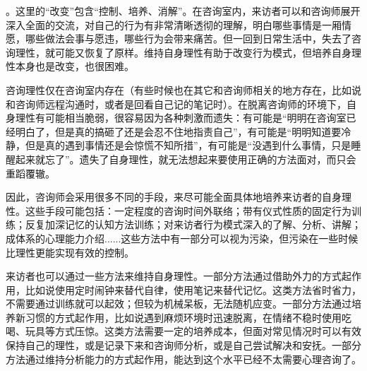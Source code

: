 。这里的“改变”包含“控制、培养、消解”。在咨询室内，来访者可以和咨询师展开深入全面的交流，对自己的行为有非常清晰透彻的理解，明白哪些事情是一厢情愿，哪些做法会事与愿违，哪些行为会带来痛苦。但一回到日常生活中，失去了咨询理性，就可能又恢复了原样。维持自身理性有助于改变行为模式，但培养自身理性本身也是改变，也很困难。

咨询理性仅在咨询室内存在（有些时候也在其它和咨询师相关的地方存在，比如说和咨询师远程沟通时，或者是回看自己记的笔记时）。在脱离咨询师的环境下，自身理性有可能相当脆弱，很容易因为各种刺激而遗失：有可能是“明明在咨询室已经明白了，但是真的搞砸了还是会忍不住地指责自己”，有可能是“明明知道要冷静，但是真的遇到事情还是会惊慌不知所措”，有可能是“没遇到什么事情，只是睡醒起来就忘了”。遗失了自身理性，就无法想起来要使用正确的方法面对，而只会重蹈覆辙。

因此，咨询师会采用很多不同的手段，来尽可能全面具体地培养来访者的自身理性。这些手段可能包括：一定程度的咨询时间外联络；带有仪式性质的固定行为训练；反复加深记忆的认知方法训练；对来访者行为模式深入的了解、分析、讲解；成体系的心理能力介绍......这些方法中有一部分可以视为污染，但污染在一些时候比理性更能实现有效的控制。

来访者也可以通过一些方法来维持自身理性。一部分方法通过借助外力的方式起作用，比如说使用定时闹钟来替代自律，使用笔记来替代记忆。这类方法省时省力，不需要通过训练就可以起效；但较为机械呆板，无法随机应变。一部分方法通过培养新习惯的方式起作用，比如说遇到麻烦环境时迅速脱离，在情绪不稳时使用吃喝、玩具等方式压惊。这类方法需要一定的培养成本，但面对常见情况时可以有效保持自己的理性，或是记录下来和咨询师分析，或是自己尝试解决和安抚。一部分方法通过维持分析能力的方式起作用，能达到这个水平已经不太需要心理咨询了。

